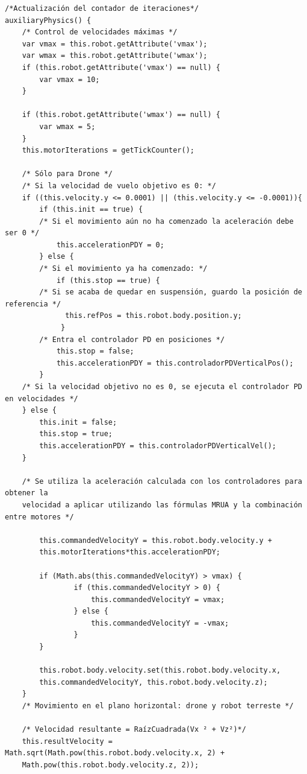 \footnotesize {
\begin{verbatim}
/*Actualización del contador de iteraciones*/
auxiliaryPhysics() {
    /* Control de velocidades máximas */
    var vmax = this.robot.getAttribute('vmax');
	var wmax = this.robot.getAttribute('wmax');
	if (this.robot.getAttribute('vmax') == null) {
	    var vmax = 10;
	}
	    
    if (this.robot.getAttribute('wmax') == null) {
        var wmax = 5;
	}
    this.motorIterations = getTickCounter(); 
               
    /* Sólo para Drone */
    /* Si la velocidad de vuelo objetivo es 0: */
    if ((this.velocity.y <= 0.0001) || (this.velocity.y <= -0.0001)){
        if (this.init == true) {
        /* Si el movimiento aún no ha comenzado la aceleración debe ser 0 */
            this.accelerationPDY = 0;
        } else { 
        /* Si el movimiento ya ha comenzado: */
    	    if (this.stop == true) {
    	/* Si se acaba de quedar en suspensión, guardo la posición de referencia */
    		  this.refPos = this.robot.body.position.y;
    		 }
    	/* Entra el controlador PD en posiciones */
            this.stop = false;
    		this.accelerationPDY = this.controladorPDVerticalPos();
    	}
    /* Si la velocidad objetivo no es 0, se ejecuta el controlador PD en velocidades */
    } else {
        this.init = false;
        this.stop = true;
        this.accelerationPDY = this.controladorPDVerticalVel();
    }
                
    /* Se utiliza la aceleración calculada con los controladores para obtener la 
    velocidad a aplicar utilizando las fórmulas MRUA y la combinación entre motores */
                
        this.commandedVelocityY = this.robot.body.velocity.y + 
        this.motorIterations*this.accelerationPDY;
        
	    if (Math.abs(this.commandedVelocityY) > vmax) {
            	if (this.commandedVelocityY > 0) {
                    this.commandedVelocityY = vmax;
            	} else {
                    this.commandedVelocityY = -vmax;
            	}
        }   
        
        this.robot.body.velocity.set(this.robot.body.velocity.x, 
        this.commandedVelocityY, this.robot.body.velocity.z); 
    }
    /* Movimiento en el plano horizontal: drone y robot terreste */
    
    /* Velocidad resultante = RaízCuadrada(Vx ² + Vz²)*/
	this.resultVelocity = Math.sqrt(Math.pow(this.robot.body.velocity.x, 2) + 
	Math.pow(this.robot.body.velocity.z, 2));
	

\end{verbatim}}

